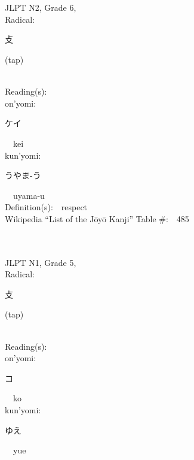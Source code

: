 \begin{multicols}{2}
\ \ \\
{\fontsize{34pt}{40pt}  }\ \ \\  %
{JLPT N2, Grade 6, \\Radical:\ \ {\begin{CJK}{UTF8}{min} 攴 \end{CJK}} (tap) } \\
Reading(s):\ \ \\
{\hspace*{1em}}on'yomi:\ \ \\
{\hspace*{2em}}{\begin{CJK}{UTF8}{min} ケイ \end{CJK}}\ \ kei\ \ \\
{\hspace*{1em}}kun'yomi:\ \ \\
{\hspace*{2em}}{\begin{CJK}{UTF8}{min} うやま-う \end{CJK}}\ \ uyama-u\ \ \\
Definition(s):\ \ respect \\
Wikipedia ``List of the J\=oy\=o Kanji'' Table \#:\ \ 485 \\
\ \ \\
{\fontsize{34pt}{40pt}  }\ \ \\  %
{JLPT N1, Grade 5, \\Radical:\ \ {\begin{CJK}{UTF8}{min} 攴 \end{CJK}} (tap) } \\
Reading(s):\ \ \\
{\hspace*{1em}}on'yomi:\ \ \\
{\hspace*{2em}}{\begin{CJK}{UTF8}{min} コ \end{CJK}}\ \ ko\ \ \\
{\hspace*{1em}}kun'yomi:\ \ \\
{\hspace*{2em}}{\begin{CJK}{UTF8}{min} ゆえ \end{CJK}}\ \ yue\ \ \\

\end{multicols}
